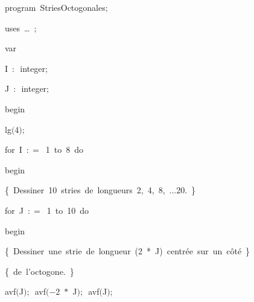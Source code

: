 
{
\parindent {}
\medskip

\carrenoir
\vspace{\neglskip}\mbox{\blc  \idt  \mcl program\idt \ StriesOctogonales$;$
}\par 
\vspace{\neglskip}\mbox{\blc \blk\idt \mcl uses\idt \ \ldots\ $;$
}\par 
\pagebreak[3] 
\vspace{\neglskip}\mbox{\blc  \blk\idt  \mcl var\idt }\par 
\vspace{\neglskip}\mbox{\blc  \blk\blk\idt  I\ $:$\ integer$;$\ }\par 
\vspace{\neglskip}\mbox{\blc  \blk\blk\idt  J\ $:$\ integer$;$}\par 
\vspace{\neglskip}\mbox{\blc  \idt  \mcl begin\idt }\par 
\vspace{\neglskip}\mbox{\blc  \blk\idt  lg$($4$)$$;$}\par 
\pagebreak[3] 
\vspace{\neglskip}\mbox{\blc  \blk\idt  \mcl for\idt \ I\ $:$$=$\ 1\ \mcl to\idt \ 8\ \mcl do\idt }\par 
\vspace{\neglskip}\mbox{\blc  \blk\blk\idt  \mcl begin\idt }\par 
\vspace{\neglskip}\mbox{\blc  \blk\blk\blk\idt  \cmt  \{\ Dessiner\ 10\ stries\ de\ longueurs\ 2,\ 4,\ 8,\ ...20.\ \}\idt }\par 
\pagebreak[3] 
\vspace{\neglskip}\mbox{\blc  \blk\blk\blk\idt  \mcl for\idt \ J\ $:$$=$\ 1\ \mcl to\idt \ 10\ \mcl do\idt }\par 
\vspace{\neglskip}\mbox{\blc  \blk\blk\blk\blk\idt  \mcl begin\idt }\par 
\vspace{\neglskip}\mbox{\blc  \blk\blk\blk\blk\blk\idt  \cmt  \{\ Dessiner\ une\ strie\ de\ longueur\ (2\ *\ J)\ centrée\ sur\ un\ côté\ \}\idt }\par 
\vspace{\neglskip}\mbox{\blc  \blk\blk\blk\blk\blk\idt  \cmt  \{\ de\ l{'}octogone.\ \}\idt }\par 
\vspace{\neglskip}\mbox{\blc  \blk\blk\blk\blk\blk\idt  avf$($J$)$$;$\ avf$($$-$2\ $\ast$\ J$)$$;$\ avf$($J$)$$;$\ }\par 
}

